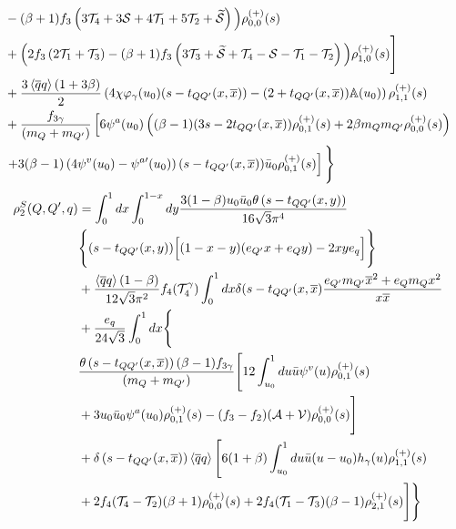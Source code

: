 \begin{align}
        &- (\beta+1)f_3\left(3\mathcal{T}_4 + 3\mathcal{S}+4\nonumber\mathcal{T}_1+5\mathcal{T}_2+\widetilde{\mathcal{S}}\right)\Big)\rho^{(+)}_{0,0}(s)\\
        &+\Big(2f_3\left(2\mathcal{T}_1+\mathcal{T}_3\right)-\nonumber(\beta+1)f_3\left(3\mathcal{T}_3+\widetilde{\mathcal{S}}+\mathcal{T}_4-\mathcal{S}-\mathcal{T}_1-\mathcal{T}_2\right)\Big)\rho^{(+)}_{1,0}(s)\Bigg]\\
        \nonumber&+\dfrac{3\left\langle\overline{q}q\right\rangle(1+3\beta)}{2}\left(4\chi\varphi_\gamma(u_0)(s-t_{QQ^\prime}(x,\overline{x}))-(2+t_{QQ^\prime}(x,\overline{x}))\nonumber\mathbb{A}(u_0)\right)\rho^{(+)}_{1,1}(s)\\
        \nonumber&+\dfrac{f_{3\gamma}}{(m_Q+m_{Q^\prime})}\left[6\psi^a(u_0)\left((\beta-1)(3s-2t_{QQ^\prime}(x,\overline{x}))\rho^{(+)}_{0,1}(s)+2\beta m_Qm_{Q^\prime}\rho^{(+)}_{0,0}(s)\right)\right.\\
        \nonumber&\left.+3(\beta-1)\left(4\psi^v(u_0)-\psi^{a\prime}(u_0)\right)(s-t_{QQ^\prime}(x,\overline{x}))\bar{u}_0\rho^{(+)}_{0,1}(s)\right]\Bigg\}    
\end{align}
%
\begin{align}
        \nonumber\rho_2^S(Q,Q^\prime,q) &= \int_0^1 dx \int_0^{1-x} dy \dfrac{3(1-\beta)u_0\bar{u}_0\theta\left(s-t_{QQ^\prime}(x,y)\right)}{16\sqrt{3}\pi^4}\\
        \nonumber&\Bigg\{(s-t_{QQ^\prime}(x,y))\Big[(1-x-y)(e_{Q^\prime}x+e_Qy) - 2xye_q\Big]\Bigg\}\\
        \nonumber&+\dfrac{\left\langle\overline{q}q\right\rangle(1-\beta)}{12\sqrt{3}\pi^2}f_4(\mathcal{T}_4^\gamma)\int_0^1dx\delta(s-t_{QQ^\prime}(x,\overline{x})\dfrac{e_{Q^\prime}m_{Q^\prime}\overline{x}^2+e_Qm_Qx^2}{x\overline{x}}\\
        \nonumber&+\dfrac{e_q}{24\sqrt{3}} \int_0^1 dx\Bigg\{\\ 
        &\dfrac{\theta\left(s-t_{QQ^\prime}(x,\overline{x})\right)(\beta-1)f_{3\gamma}}{(m_Q+m_{Q^\prime})}\Bigg[12\int_{u_0}^1 du  \bar{u} \psi^v(u) \rho^{(+)}_{0,1}(s)\\
        \nonumber&+3 u_0 \bar{u}_0 \psi^a(u_0) \rho^{(+)}_{0,1}(s) -(f_3-f_2)(\mathcal{A}+\mathcal{V})\rho^{(+)}_{0,0}(s)\Bigg]\\
        \nonumber&+\delta\left(s-t_{QQ^\prime}(x,\overline{x})\right)\left\langle\overline{q}q\right\rangle\Bigg[6(1+\beta)\int_{u_0}^1 du \bar{u} (u-u_0) h_\gamma(u) \rho^{(+)}_{1,1}(s)\\
        \nonumber&+2f_4(\mathcal{T}_4-\mathcal{T}_2) (\beta+1)  \rho^{(+)}_{0,0}(s)+2f_4(\mathcal{T}_1-\mathcal{T}_3) (\beta-1) \rho^{(+)}_{2,1}(s)\Bigg]\Bigg\}
    \end{align}
%
